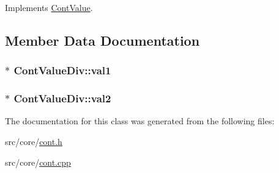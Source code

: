 Implements \hyperlink{a00086_ae3ce98084899bf1a873a1ec6bf15116e}{Cont\-Value}.



\subsection{Member Data Documentation}
\hypertarget{a00089_addfcd0e09c6bafda2d994676d7806d7b}{
\subsubsection[{val1}]{$\ast$ Cont\-Value\-Div\-::val1\hspace{0.3cm}{\ttfamily [private]}}}\label{a00089_addfcd0e09c6bafda2d994676d7806d7b}
\hypertarget{a00089_af84919a87c2e8eb410484368f5172cb0}{
\subsubsection[{val2}]{ $\ast$ Cont\-Value\-Div\-::val2\hspace{0.3cm}{\ttfamily [private]}}}\label{a00089_af84919a87c2e8eb410484368f5172cb0}


The documentation for this class was generated from the following files\-:\begin{DoxyCompactItemize}
\item 
src/core/\hyperlink{a00218}{cont.\-h}\item 
src/core/\hyperlink{a00217}{cont.\-cpp}\end{DoxyCompactItemize}
